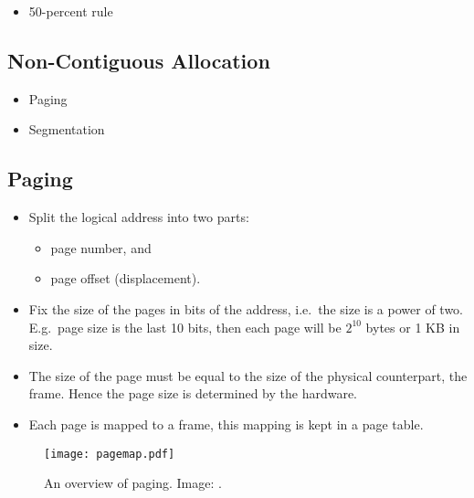 \documentclass{beamer}
\begin{document}
\begin{frame}{\insertsubsectionhead}
  \begin{itemize}
    \item 50-percent rule
  \end{itemize}
\end{frame}

\subsection{Non-Contiguous Allocation}

\begin{frame}{\insertsubsectionhead}
  \begin{itemize}
    \item Paging
    \item Segmentation
  \end{itemize}
\end{frame}

\subsection{Paging}

\begin{frame}{\insertsubsectionhead}
  \begin{itemize}
    \item Split the logical address into two parts:
      \begin{itemize}
        \item page number, and
        \item page offset (displacement).
      \end{itemize}

    \item Fix the size of the pages in bits of the address, i.e.\ the size is 
      a power of two.
      E.g.\ page size is the last 10 bits, then each page will be \(2^{10}\) 
      bytes or 1 KB in size.

    \item The size of the page must be equal to the size of the physical 
      counterpart, the frame.
      Hence the page size is determined by the hardware.

    \item Each page is mapped to a frame, this mapping is kept in a page table.

  \end{itemize}
\end{frame}

\begin{frame}{\insertsubsectionhead}
  \begin{figure}
    \texttt{[image: pagemap.pdf]}
    \caption{An overview of paging.
      Image: \cite{Silberschatz2013osc}.}
  \end{figure}
\end{frame}
\end{document}
